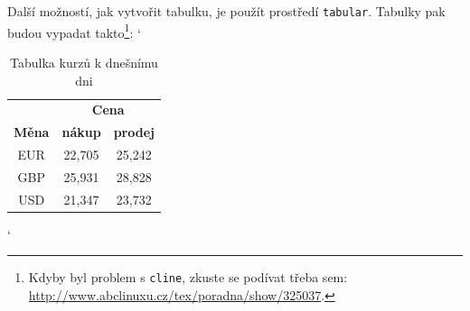 \documentclass[a4paper, 11pt]{article}
\begin{document}
Další možností, jak vytvořit tabulku, je použít prostředí \verb|tabular|. 
Tabulky pak budou vypadat takto\footnote[1]{Kdyby byl problem s \texttt{cline}, zkuste se podívat třeba sem: 
\href{http://www.abclinuxu.cz/tex/poradna/show/325037}{http://www.abclinuxu.cz/tex/poradna/show/325037}.}:
\bigskip
\catcode`
\begin{table}[ht]
    \begin{center}
        \begin{tabular}{|c|c|c|}
            \hline
            & \multicolumn{2}{c|}{\textbf{Cena}} \\ \cline{2-3}
            \textbf{Měna} & \textbf{nákup} & \textbf{prodej} \\ 
            \hline
            EUR & 22,705 & 25,242 \\
            GBP & 25,931 & 28,828 \\
            USD & 21,347 & 23,732 \\
            \hline
        \end{tabular}
        \caption{Tabulka kurzů k dnešnímu dni} \label{tab1}
    \end{center}
\end{table}
\catcode`
\end{document}
